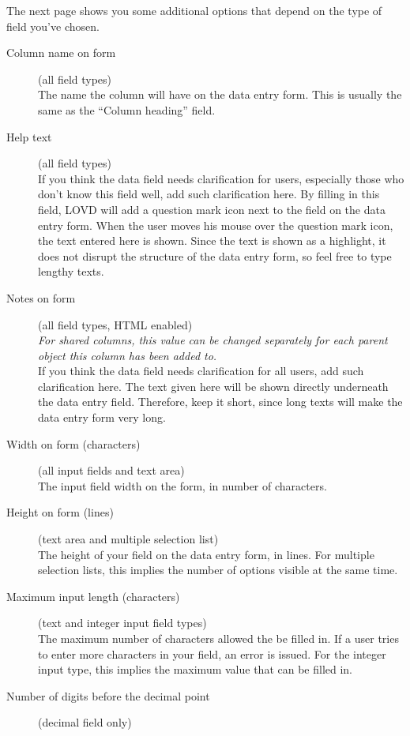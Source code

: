 \vskip 1cm

\noindent
The next page shows you some additional options that depend on the type of field you've chosen.
\begin{description}
  \item[Column name on form] (all field types)\hfill \\
  The name the column will have on the data entry form.
  This is usually the same as the ``Column heading'' field.
  \item[Help text] (all field types)\hfill \\
  If you think the data field needs clarification for users, especially those who don't know this field well, add such clarification here.
  By filling in this field, LOVD will add a question mark icon next to the field on the data entry form.
  When the user moves his mouse over the question mark icon, the text entered here is shown.
  Since the text is shown as a highlight, it does not disrupt the structure of the data entry form, so feel free to type lengthy texts.
  \item[Notes on form] (all field types, HTML enabled)\hfill \\
  \emph{For shared columns, this value can be changed separately for each parent object this column has been added to.}
  \\
  If you think the data field needs clarification for all users, add such clarification here.
  The text given here will be shown directly underneath the data entry field.
  Therefore, keep it short, since long texts will make the data entry form very long.
  \item[Width on form (characters)] (all input fields and text area)\hfill \\
  The input field width on the form, in number of characters.
  \item[Height on form (lines)] (text area and multiple selection list)\hfill \\
  The height of your field on the data entry form, in lines.
  For multiple selection lists, this implies the number of options visible at the same time.
  \item[Maximum input length (characters)] (text and integer input field types)\hfill \\
  The maximum number of characters allowed the be filled in.
  If a user tries to enter more characters in your field, an error is issued.
  For the integer input type, this implies the maximum value that can be filled in.
  \item[Number of digits before the decimal point] (decimal field only)\hfill \\

\end{description}
